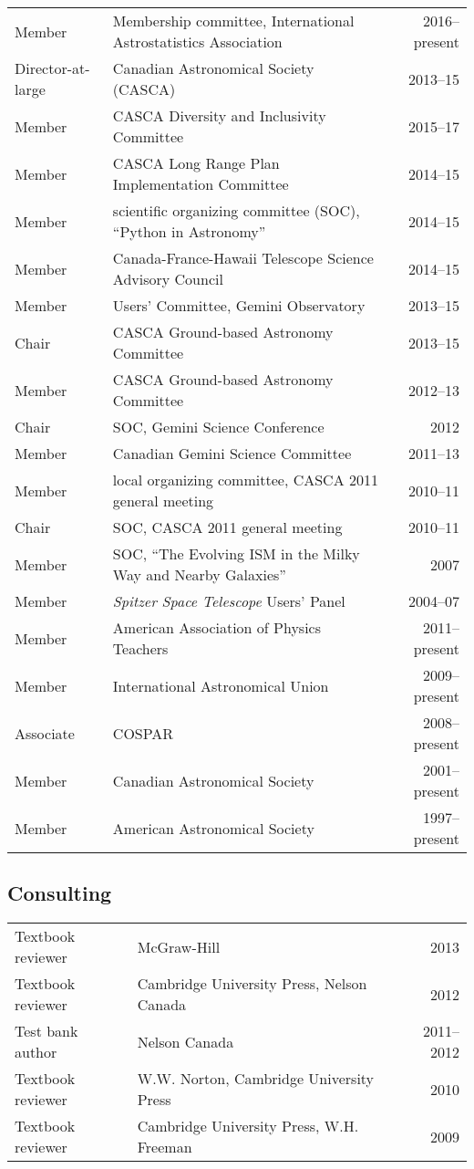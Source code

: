 \documentclass[12pt]{article}
\begin{document}
\vspace{0.5cm}
\begin{tabularx}{\textwidth}{lXr}
Member & Membership committee, International Astrostatistics Association & 2016--present\\
Director-at-large& Canadian Astronomical Society (CASCA)& 2013--15\\
Member& CASCA Diversity and Inclusivity Committee& 2015--17\\
Member& CASCA Long Range Plan Implementation Committee& 2014--15\\
Member& scientific organizing committee (SOC), ``Python in Astronomy'' & 2014--15\\
Member& Canada-France-Hawaii Telescope Science Advisory Council& 2014--15\\
Member&  Users' Committee, Gemini Observatory& 2013--15\\
Chair& CASCA Ground-based Astronomy Committee& 2013--15\\
Member& CASCA Ground-based Astronomy Committee& 2012--13\\
Chair& SOC, Gemini Science Conference& 2012\\
Member& Canadian Gemini Science Committee& 2011--13\\
Member& local organizing committee, CASCA 2011 general meeting&2010--11\\
Chair& SOC, CASCA 2011 general meeting&2010--11\\
Member& SOC, ``The Evolving ISM in the Milky Way and Nearby Galaxies'' & 2007\\
Member& {\it Spitzer Space Telescope} Users' Panel& 2004--07\\
Member& American Association of Physics Teachers& 2011--present\\
Member& International Astronomical Union& 2009--present\\
Associate& COSPAR& 2008--present\\
Member& Canadian Astronomical Society& 2001--present\\
Member& American Astronomical Society& 1997--present
\end{tabularx}

\subsection{Consulting}
\begin{tabularx}{\textwidth}{lXr}
Textbook reviewer& McGraw-Hill& 2013\\
Textbook reviewer & Cambridge University Press, Nelson Canada&2012\\
Test bank author& Nelson Canada& 2011--2012\\
Textbook reviewer& W.W. Norton, Cambridge University Press& 2010\\
Textbook reviewer& Cambridge University Press, W.H. Freeman& 2009
\end{tabularx}
\end{document}

